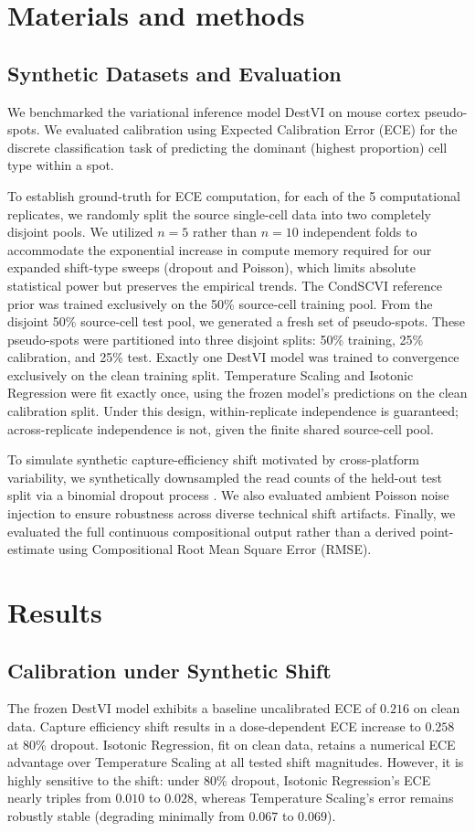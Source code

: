\documentclass[unnumsec,webpdf,modern,large]{oup-authoring-template}
\begin{document}
\section{Materials and methods}
\subsection{Synthetic Datasets and Evaluation}
We benchmarked the variational inference model DestVI on mouse cortex pseudo-spots. We evaluated calibration using Expected Calibration Error (ECE) for the discrete classification task of predicting the dominant (highest proportion) cell type within a spot. 

To establish ground-truth for ECE computation, for each of the 5 computational replicates, we randomly split the source single-cell data into two completely disjoint pools. We utilized $n=5$ rather than $n=10$ independent folds to accommodate the exponential increase in compute memory required for our expanded shift-type sweeps (dropout and Poisson), which limits absolute statistical power but preserves the empirical trends. The CondSCVI reference prior was trained exclusively on the 50\% source-cell training pool. From the disjoint 50\% source-cell test pool, we generated a fresh set of pseudo-spots. These pseudo-spots were partitioned into three disjoint splits: 50\% training, 25\% calibration, and 25\% test. Exactly one DestVI model was trained to convergence exclusively on the clean training split. Temperature Scaling and Isotonic Regression were fit exactly once, using the frozen model's predictions on the clean calibration split. Under this design, within-replicate independence is guaranteed; across-replicate independence is not, given the finite shared source-cell pool.

To simulate synthetic capture-efficiency shift motivated by cross-platform variability, we synthetically downsampled the read counts of the held-out test split via a binomial dropout process \citep{townes2019feature}. We also evaluated ambient Poisson noise injection to ensure robustness across diverse technical shift artifacts. Finally, we evaluated the full continuous compositional output rather than a derived point-estimate using Compositional Root Mean Square Error (RMSE).

\section{Results}
\subsection{Calibration under Synthetic Shift}
The frozen DestVI model exhibits a baseline uncalibrated ECE of $0.216$ on clean data. Capture efficiency shift results in a dose-dependent ECE increase to $0.258$ at 80\% dropout. Isotonic Regression, fit on clean data, retains a numerical ECE advantage over Temperature Scaling at all tested shift magnitudes. However, it is highly sensitive to the shift: under 80\% dropout, Isotonic Regression's ECE nearly triples from $0.010$ to $0.028$, whereas Temperature Scaling's error remains robustly stable (degrading minimally from $0.067$ to $0.069$).
\end{document}
